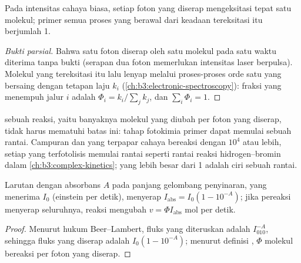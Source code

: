 \begin{proposition}\label{prop:b3:photochemistry:stark-einstein}
Pada intensitas cahaya biasa, setiap foton yang diserap mengeksitasi tepat
satu molekul;  primer semua proses yang berawal dari keadaan
tereksitasi itu berjumlah 1.
\end{proposition}

\begin{proof}[Bukti parsial]
Bahwa satu foton diserap oleh satu molekul pada satu waktu diterima tanpa
bukti (serapan dua foton memerlukan intensitas laser berpulsa). Molekul yang
tereksitasi itu lalu lenyap melalui proses-proses orde satu yang bersaing
dengan tetapan laju $k_i$ (\cref{ch:b3:electronic-spectroscopy}): fraksi yang
menempuh jalur $i$ adalah $\Phi_i =
k_i/\sum_jk_j$, dan $\sum_i\Phi_i = 1$.
\end{proof}

 sebuah reaksi, yaitu banyaknya molekul yang diubah per foton
yang diserap, tidak harus mematuhi batas ini: tahap fotokimia primer dapat
memulai sebuah rantai. Campuran  dan  yang terpapar cahaya
bereaksi dengan  $10^4$ atau lebih, setiap  yang
terfotolisis memulai rantai seperti rantai reaksi hidrogen--bromin dalam
\cref{ch:b3:complex-kinetics};  yang lebih besar dari 1 adalah
ciri sebuah rantai.

\begin{proposition}\label{prop:b3:photochemistry:rate}
Larutan dengan absorbans $A$ pada panjang gelombang penyinaran, yang menerima
 $I_0$ (einstein per detik), menyerap $I_{\mathrm{abs}} = I_0(1 - 10^{-A})$;
jika pereaksi menyerap seluruhnya, reaksi mengubah $v = \Phi I_{\mathrm{abs}}$ mol
per detik.
\end{proposition}

\begin{proof}
Menurut hukum Beer--Lambert, fluks yang diteruskan adalah $I_010^{-A}$, sehingga
fluks yang diserap adalah $I_0(1 - 10^{-A})$; menurut definisi ,
$\Phi$ molekul bereaksi per foton yang diserap.
\end{proof}

